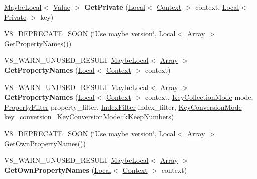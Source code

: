 \begin{DoxyCompactItemize}
\mbox{\hyperlink{classv8_1_1MaybeLocal}{Maybe\+Local}}$<$ \mbox{\hyperlink{classv8_1_1Value}{Value}} $>$ {\bfseries Get\+Private} (\mbox{\hyperlink{classv8_1_1Local}{Local}}$<$ \mbox{\hyperlink{classv8_1_1Context}{Context}} $>$ context, \mbox{\hyperlink{classv8_1_1Local}{Local}}$<$ \mbox{\hyperlink{classv8_1_1Private}{Private}} $>$ key)
\item 
\mbox{\hyperlink{classv8_1_1Object_a3f735ad2eab826ddc5eba467ce624acb}{V8\+\_\+\+D\+E\+P\+R\+E\+C\+A\+T\+E\+\_\+\+S\+O\+ON}} (\char`\"{}Use maybe version\char`\"{}, Local$<$ \mbox{\hyperlink{classv8_1_1Array}{Array}} $>$ Get\+Property\+Names())
\item 
\mbox{\label{classv8_1_1Object_a771be1943535959085da5c384f8e6405}} 
V8\+\_\+\+W\+A\+R\+N\+\_\+\+U\+N\+U\+S\+E\+D\+\_\+\+R\+E\+S\+U\+LT \mbox{\hyperlink{classv8_1_1MaybeLocal}{Maybe\+Local}}$<$ \mbox{\hyperlink{classv8_1_1Array}{Array}} $>$ {\bfseries Get\+Property\+Names} (\mbox{\hyperlink{classv8_1_1Local}{Local}}$<$ \mbox{\hyperlink{classv8_1_1Context}{Context}} $>$ context)
\item 
\mbox{\label{classv8_1_1Object_af892909e40c273af09893e693f4a0137}} 
V8\+\_\+\+W\+A\+R\+N\+\_\+\+U\+N\+U\+S\+E\+D\+\_\+\+R\+E\+S\+U\+LT \mbox{\hyperlink{classv8_1_1MaybeLocal}{Maybe\+Local}}$<$ \mbox{\hyperlink{classv8_1_1Array}{Array}} $>$ {\bfseries Get\+Property\+Names} (\mbox{\hyperlink{classv8_1_1Local}{Local}}$<$ \mbox{\hyperlink{classv8_1_1Context}{Context}} $>$ context, \mbox{\hyperlink{namespacev8_a0cee20f5c7f0d59d0835af8e537388dc}{Key\+Collection\+Mode}} mode, \mbox{\hyperlink{namespacev8_afbf02b6b1152a3e25d7bde90798209ac}{Property\+Filter}} property\+\_\+filter, \mbox{\hyperlink{namespacev8_a46fd71fef702b35b34ed7495e7a63323}{Index\+Filter}} index\+\_\+filter, \mbox{\hyperlink{namespacev8_aa65aeff871614520d8033dead4b34e38}{Key\+Conversion\+Mode}} key\+\_\+conversion=Key\+Conversion\+Mode\+::k\+Keep\+Numbers)
\item 
\mbox{\hyperlink{classv8_1_1Object_aa72e9d0d22d1d4a4c4b63827a5469d40}{V8\+\_\+\+D\+E\+P\+R\+E\+C\+A\+T\+E\+\_\+\+S\+O\+ON}} (\char`\"{}Use maybe version\char`\"{}, Local$<$ \mbox{\hyperlink{classv8_1_1Array}{Array}} $>$ Get\+Own\+Property\+Names())
\item 
\mbox{\label{classv8_1_1Object_ab4f1fc692a02c11d749a7d5120e67026}} 
V8\+\_\+\+W\+A\+R\+N\+\_\+\+U\+N\+U\+S\+E\+D\+\_\+\+R\+E\+S\+U\+LT \mbox{\hyperlink{classv8_1_1MaybeLocal}{Maybe\+Local}}$<$ \mbox{\hyperlink{classv8_1_1Array}{Array}} $>$ {\bfseries Get\+Own\+Property\+Names} (\mbox{\hyperlink{classv8_1_1Local}{Local}}$<$ \mbox{\hyperlink{classv8_1_1Context}{Context}} $>$ context)

\end{DoxyCompactItemize}
